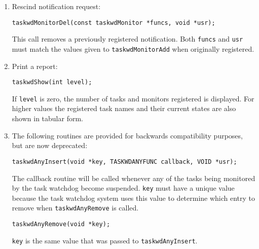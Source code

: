 \begin{enumerate}
\item Rescind notification request:

\begin{verbatim}
taskwdMonitorDel(const taskwdMonitor *funcs, void *usr);
\end{verbatim}

This call removes a previously registered notification. Both \verb|funcs| and \verb|usr| must match the values given to 
\verb|taskwdMonitorAdd| when originally registered.

\item Print a report:

\begin{verbatim}
taskwdShow(int level);
\end{verbatim}

If \verb|level| is zero, the number of tasks and monitors registered is displayed. For higher values the registered task 
names and their current states are also shown in tabular form.

\item The following routines are provided for backwards compatibility purposes, but are now deprecated:

\begin{verbatim}
taskwdAnyInsert(void *key, TASKWDANYFUNC callback, VOID *usr);
\end{verbatim}

The callback routine will be called whenever any of the tasks being monitored by the task watchdog become 
suspended. \verb|key| must have a unique value because the task watchdog system uses this value to determine which 
entry to remove when \verb|taskwdAnyRemove| is called.

\begin{verbatim}
taskwdAnyRemove(void *key);
\end{verbatim}

\verb|key| is the same value that was passed to \verb|taskwdAnyInsert|.
\end{enumerate}
